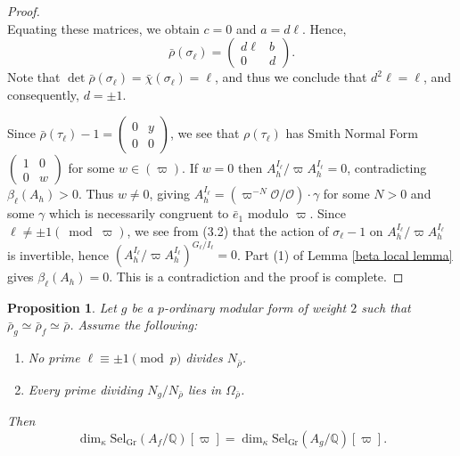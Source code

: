 \documentclass[table]{amsart}
\newtheorem{proposition}[theorem]{Proposition}
\newcommand{\Q}{\mathbb{Q}}
\numberwithin{equation}{section}
\begin{document}
\begin{proof}
\[\]
Equating these matrices, we obtain $c = 0$ and $a = d\ell$.
Hence,
\begin{equation}\label{bar rho ell}
\bar{\rho}(\sigma_\ell) = \begin{pmatrix} d\ell & b \\ 0 & d \end{pmatrix}.
\end{equation}
Note that $\det \bar{\rho}(\sigma_\ell)=\bar{\chi}(\sigma_\ell) = \ell$, and thus we conclude that $d^2 \ell = \ell$, and consequently, $d = \pm 1$. 
\par Since $\bar{\rho}\left(\tau_{\ell}\right)-1=\left(\begin{array}{ll}0 & y \\ 0 & 0\end{array}\right)$, we see that $\rho\left(\tau_{\ell}\right)$ has Smith Normal Form $\left(\begin{array}{cc}1 & 0 \\ 0 & w\end{array}\right)$ for some $w \in(\varpi)$. If $w=0$ then $A_{h}^{I_{\ell}} / \varpi A_{h}^{I_{\ell}}=0$, contradicting $\beta_\ell\left(A_{h}\right)>0$. Thus $w \neq 0$, giving $A_{h}^{I_{\ell}}=\left(\varpi^{-N} \mathcal{O} / \mathcal{O}\right) \cdot \gamma$ for some $N>0$ and some $\gamma$ which is necessarily congruent to $\bar{e}_{1}$ modulo $\varpi$. Since $\ell \neq \pm 1(\bmod \varpi)$, we see from (3.2) that the action of $\sigma_{\ell}-1$ on $A_{h}^{I_{\ell}} / \varpi A_{h}^{I_{\ell}}$ is invertible, hence $\left(A_{h}^{I_{\ell}} / \varpi A_{h}^{I_{\ell}}\right)^{G_{\ell} / I_{\ell}}=0$. Part (1) of Lemma \ref{beta local lemma} gives $\beta_\ell\left(A_{h}\right)=0$. This is a contradiction and the proof is complete. \end{proof}

\begin{proposition}\label{main propn}
Let $g$ be a $p$-ordinary modular form of weight $2$ such that $\bar{\rho}_g \simeq \bar{\rho}_f \simeq \bar{\rho}$. Assume the following:
\begin{enumerate}
    \item No prime $\ell \equiv \pm 1 \pmod{p}$ divides $N_{\bar{\rho}}$.
    \item Every prime dividing $N_g/N_{\bar{\rho}}$ lies in $\Omega_{\bar{\rho}}$.
\end{enumerate}
Then
\[
\dim_{\kappa} \mathrm{Sel}_{\mathrm{Gr}}(A_f/\Q)[\varpi] = \dim_{\kappa} \mathrm{Sel}_{\mathrm{Gr}}(A_g/\Q)[\varpi].
\]
\end{proposition}
\end{document}
